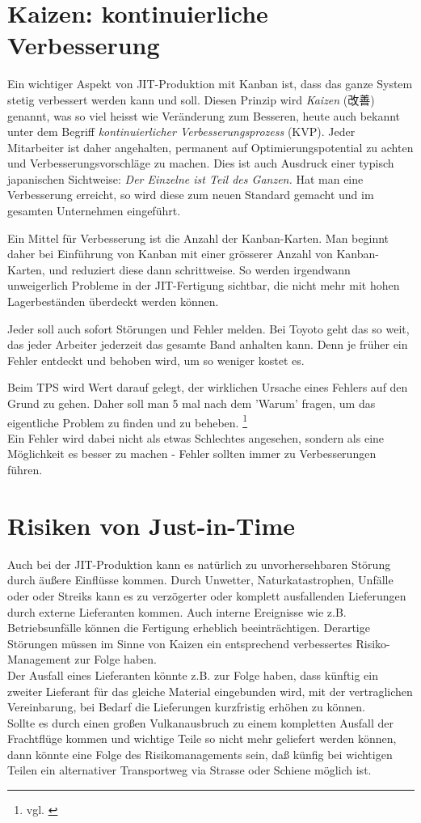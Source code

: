 \section{Kaizen: kontinuierliche Verbesserung}
Ein wichtiger Aspekt von JIT-Produktion mit Kanban ist, dass das ganze System stetig verbessert werden kann und soll.
Diesen Prinzip wird \emph{Kaizen} ({\CN 改善}) genannt, was so viel heisst wie Veränderung zum Besseren, 
heute auch bekannt unter dem Begriff \emph{kontinuierlicher Verbesserungsprozess} (KVP).
Jeder Mitarbeiter ist daher angehalten, permanent auf Optimierungspotential zu achten und Verbesserungsvorschläge zu machen.
Dies ist auch Ausdruck einer typisch japanischen Sichtweise: \emph{Der Einzelne ist Teil des Ganzen.}
Hat man eine Verbesserung erreicht, so wird diese zum neuen Standard gemacht und im gesamten Unternehmen eingeführt.

Ein Mittel für Verbesserung ist die Anzahl der Kanban-Karten.
Man beginnt daher bei Einführung von Kanban mit einer grösserer Anzahl von Kanban-Karten, und reduziert diese dann schrittweise.
So werden irgendwann unweigerlich Probleme in der JIT-Fertigung sichtbar, die nicht mehr mit hohen Lagerbeständen überdeckt werden können.

Jeder soll auch sofort Störungen und Fehler melden. 
Bei Toyoto geht das so weit, das jeder Arbeiter jederzeit das gesamte Band anhalten kann.
Denn je früher ein Fehler entdeckt und behoben wird, um so weniger kostet es.

Beim TPS  wird Wert darauf gelegt, der wirklichen Ursache eines Fehlers auf den Grund zu gehen.
Daher soll man 5 mal nach dem 'Warum' fragen, um das eigentliche Problem zu finden und zu beheben. \footnote{vgl. \cite{Toyota} }\\
Ein Fehler wird dabei nicht als etwas Schlechtes angesehen, sondern als eine Möglichkeit es besser zu machen - Fehler sollten immer zu Verbesserungen führen.

\section{Risiken von Just-in-Time}
Auch bei der JIT-Produktion kann es natürlich zu unvorhersehbaren Störung durch äußere Einflüsse kommen.
Durch Unwetter, Naturkatastrophen, Unfälle oder oder Streiks kann es zu verzögerter oder komplett ausfallenden Lieferungen durch externe Lieferanten kommen.
Auch interne Ereignisse wie z.B. Betriebsunfälle können die Fertigung erheblich beeinträchtigen.
Derartige Störungen müssen im Sinne von Kaizen ein entsprechend verbessertes Risiko-Management zur Folge haben.\\
Der Ausfall eines Lieferanten könnte z.B. zur Folge haben, dass künftig ein zweiter Lieferant für das 
gleiche Material eingebunden wird, mit der vertraglichen Vereinbarung, bei Bedarf die Lieferungen kurzfristig erhöhen zu können.\\
Sollte es durch einen großen Vulkanausbruch zu einem kompletten Ausfall der Frachtflüge kommen und 
wichtige Teile so nicht mehr geliefert werden können, dann könnte eine Folge des Risikomanagements sein, 
daß künfig bei wichtigen Teilen ein alternativer Transportweg via Strasse oder Schiene möglich ist.

